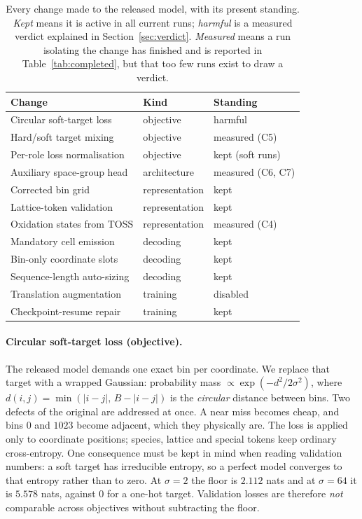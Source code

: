 \documentclass[manuscript,screen,review]{acmart}
\begin{document}
\begin{table}[h]
  \caption{Every change made to the released model, with its present standing.
  \emph{Kept} means it is active in all current runs; \emph{harmful} is a
  measured verdict explained in Section~\ref{sec:verdict}.
  \emph{Measured} means a run isolating the change has finished and is reported
  in Table~\ref{tab:completed}, but that too few runs exist to draw a verdict.}
  \label{tab:catalogue}
  \begin{footnotesize}
  \begin{tabular}{llp{2.45cm}}
    \toprule
    Change & Kind & Standing \\
    \midrule
    Circular soft-target loss      & objective     & harmful \\
    Hard/soft target mixing        & objective     & measured (C5) \\
    Per-role loss normalisation    & objective     & kept (soft runs) \\
    Auxiliary space-group head     & architecture  & measured (C6, C7) \\
    Corrected bin grid             & representation & kept \\
    Lattice-token validation       & representation & kept \\
    Oxidation states from TOSS     & representation & measured (C4) \\
    Mandatory cell emission        & decoding      & kept \\
    Bin-only coordinate slots      & decoding      & kept \\
    Sequence-length auto-sizing    & decoding      & kept \\
    Translation augmentation       & training      & disabled \\
    Checkpoint-resume repair       & training      & kept \\
    \bottomrule
  \end{tabular}
  \end{footnotesize}
\end{table}

\paragraph{Circular soft-target loss (objective).}
The released model demands one exact bin per coordinate. We replace that target
with a wrapped Gaussian: probability mass $\propto \exp(-d^{2}/2\sigma^{2})$,
where $d(i,j) = \min(|i-j|,\, B-|i-j|)$ is the \emph{circular} distance between
bins. Two defects of the original are addressed at once. A near miss becomes
cheap, and bins $0$ and $1023$ become adjacent, which they physically are. The
loss is applied only to coordinate positions; species, lattice and special
tokens keep ordinary cross-entropy. One consequence must be kept in mind when
reading validation numbers: a soft target has irreducible entropy, so a perfect
model converges to that entropy rather than to zero. At $\sigma = 2$ the floor
is $2.112$ nats and at $\sigma = 64$ it is $5.578$ nats, against $0$ for a
one-hot target. Validation losses are therefore \emph{not} comparable across
objectives without subtracting the floor.
\end{document}
